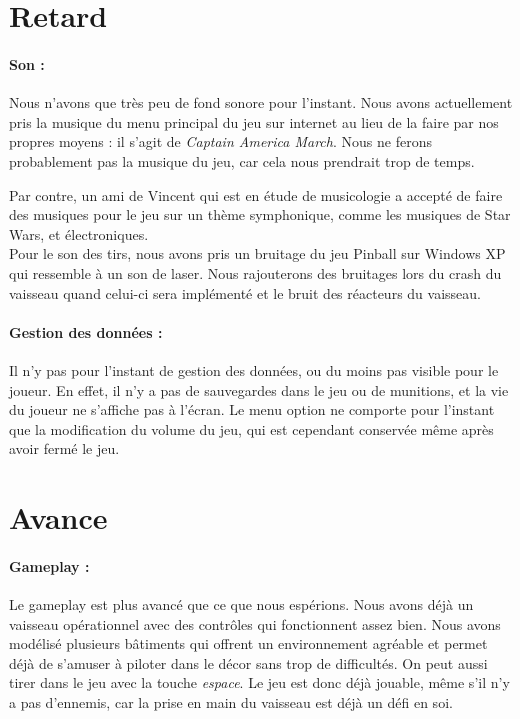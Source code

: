 \documentclass[10pt, titlepage]{report}
\begin{document}
\section{Retard}

\paragraph{Son :}
Nous n'avons que très peu de fond sonore pour l'instant. Nous avons actuellement pris la musique du menu principal du jeu sur internet au lieu de la faire par nos propres moyens : il s'agit de \textit{Captain America March}. Nous ne ferons probablement pas la musique du jeu, car cela nous prendrait trop de temps.

 Par contre, un ami de Vincent qui est en étude de musicologie a accepté de faire des musiques pour le jeu sur un thème symphonique, comme les musiques de Star Wars, et électroniques.\\

 Pour le son des tirs, nous avons pris un bruitage du jeu Pinball sur Windows XP qui ressemble à un son de laser. Nous rajouterons des bruitages lors du crash du vaisseau quand celui-ci sera implémenté et le bruit des réacteurs du vaisseau.

\paragraph{Gestion des données :}
Il n'y pas pour l'instant de gestion des données, ou du moins pas visible pour le joueur. En effet, il n'y a pas de sauvegardes dans le jeu ou de munitions, et la vie du joueur ne s'affiche pas à l'écran. Le menu option ne comporte pour l'instant que la modification du volume du jeu, qui est cependant conservée même après avoir fermé le jeu.

\section{Avance}

\paragraph{Gameplay :}
Le gameplay est plus avancé que ce que nous espérions. Nous avons déjà un vaisseau opérationnel avec des contrôles qui fonctionnent assez bien. Nous avons modélisé plusieurs bâtiments qui offrent un environnement agréable et permet déjà de s'amuser à piloter dans le décor sans trop de difficultés. On peut aussi tirer dans le jeu avec la touche \textit{espace}. Le jeu est donc déjà jouable, même s'il n'y a pas d'ennemis, car la prise en main du vaisseau est déjà un défi en soi.
\end{document}
